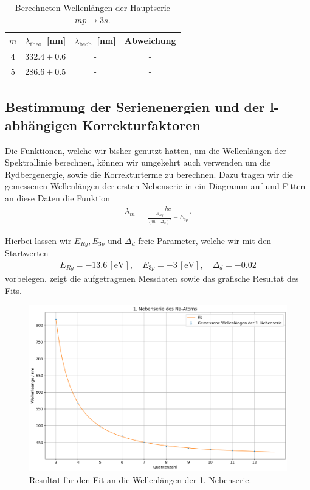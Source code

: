 \begin{table}[H]
  \centering
  \caption{Berechneten Wellenlängen der Hauptserie $mp \to 3s$.}
  \vspace*{0.5em}
  \begin{tabular}{c c c c}
      \hline
      $m$ & $\lambda_{\text{theo.}}$ [nm] & $\lambda_{\text{beob.}}$ [nm] & Abweichung \\
      \hline
      4  & $332.4 \pm 0.6$ & -     & -     \\
      5  & $286.6 \pm 0.5$  & - & - \\
      \hline
  \end{tabular}
  \label{tab:wellenlaengen_hs}
\end{table}

\subsection{Bestimmung der Serienenergien und der l-abhängigen Korrekturfaktoren}

Die Funktionen, welche wir bisher genutzt hatten, um die Wellenlängen der Spektrallinie berechnen, können wir umgekehrt auch verwenden um die Rydbergenergie, sowie die Korrekturterme zu berechnen. Dazu tragen wir die gemessenen Wellenlängen der ersten Nebenserie in ein Diagramm auf und Fitten an diese Daten die Funktion
\begin{align}
  \lambda_m = \frac{hc}{\frac{E_{Ry}}{(m-\Delta_d)^2} - E_{3p}}.
\end{align}

Hierbei lassen wir $E_{Ry}, E_{3p}$ und $\Delta_d$ freie Parameter, welche wir mit den Startwerten 
\begin{align}
  E_{Ry} = -13.6\, [\si{\electronvolt}], \quad
  E_{3p} = -3\, [\si{\electronvolt}], \quad
  \Delta_d = -0.02
\end{align}
vorbelegen.  zeigt die aufgetragenen Messdaten sowie das grafische Resultat des Fits.

\begin{figure}[H]
  \centering
  \includegraphics[width=.9\textwidth]{files/plots/na_1ns_fit.png}
  \caption{Resultat für den Fit an die Wellenlängen der 1. Nebenserie.}
  \label{fig:na_1ns_fit}
\end{figure}

